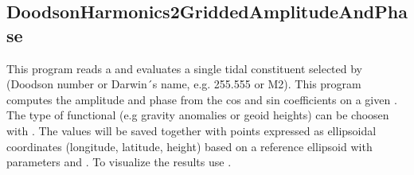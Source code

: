 \clearpage
\subsection{DoodsonHarmonics2GriddedAmplitudeAndPhase}\label{DoodsonHarmonics2GriddedAmplitudeAndPhase}
This program reads a  and evaluates a single tidal
constituent selected by  (Doodson number or Darwin´s name, e.g. 255.555 or M2).
This program computes the amplitude and phase from the cos and sin coefficients on
a given . The type of functional (e.g gravity anomalies or geoid heights)
can be choosen with .
The values will be saved together with points expressed as ellipsoidal coordinates (longitude, latitude, height)
based on a reference ellipsoid with parameters  and .
To visualize the results use .



